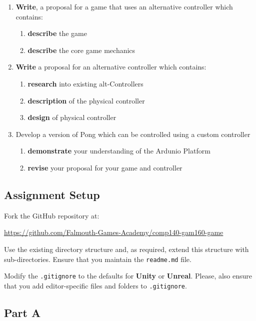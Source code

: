 \documentclass{../../fal_assignment}
\begin{document}
	\begin{enumerate}[label=(\Alph*)]
		\item \textbf{Write}, a proposal for a game that uses an alternative controller which contains:
		\begin{enumerate}[label=\roman*.]
			\item \textbf{describe} the game
			\item \textbf{describe} the core game mechanics
		\end{enumerate}
		\item \textbf{Write} a proposal for an alternative controller which contains: 
		\begin{enumerate}[label=\roman*.]
			\item \textbf{research} into existing alt-Controllers
			\item \textbf{description} of the physical controller
			\item \textbf{design} of physical controller
		\end{enumerate}
		\item {Develop} a version of Pong which can be controlled using a custom controller
		\begin{enumerate}[label=\roman*.]
			\item \textbf{demonstrate} your understanding of the Ardunio Platform
			\item \textbf{revise} your proposal for your game and controller
		\end{enumerate}
		
	\end{enumerate}
	
	\subsection*{Assignment Setup}
	
	Fork the GitHub repository at:
	
	\indent \url{https://github.com/Falmouth-Games-Academy/comp140-gam160-game}
	
	Use the existing directory structure and, as required, extend this structure with sub-directories. Ensure that you maintain the \texttt{readme.md} file.
	
	Modify the \texttt{.gitignore} to the defaults for \textbf{Unity} or \textbf{Unreal}. Please, also ensure that you add editor-specific files and folders to \texttt{.gitignore}. 
	
	\subsection*{Part A}
	
\end{document}

